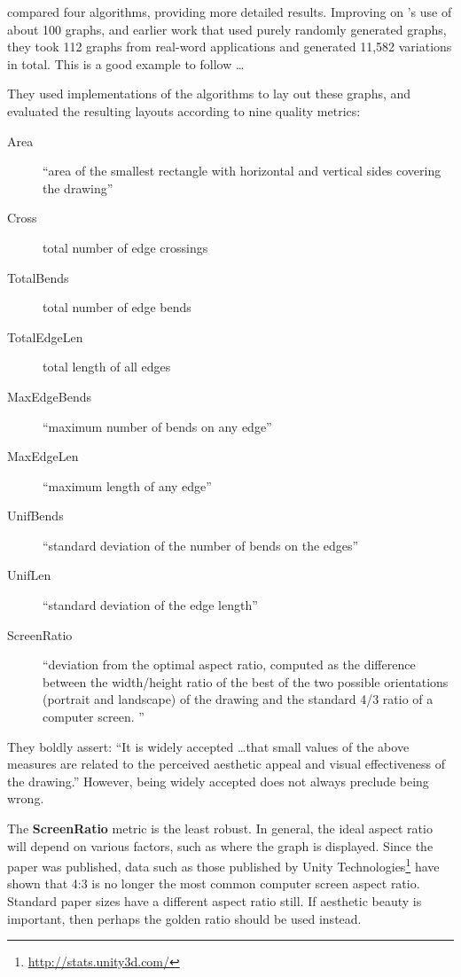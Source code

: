 \citet{DiBattista1997303} compared four algorithms, providing more detailed results.
Improving on \citeauthor{Himsolt95comparingand}'s use of about 100 graphs, and earlier work  that used purely randomly generated graphs, they took 112 graphs from real-word applications and generated 11,582 variations in total. This is a good example to follow \ldots

They used implementations of the algorithms to lay out these graphs, and evaluated the resulting layouts according to nine quality metrics:

\begin{description}
    \item[Area]
``area of the smallest rectangle with horizontal and vertical sides covering the drawing''
    \item[Cross]
total number of edge crossings
    \item[TotalBends]
total number of edge bends
    \item[TotalEdgeLen]
total length of all edges
    \item[MaxEdgeBends]
``maximum number of bends on any edge''
    \item[MaxEdgeLen]
``maximum length of any edge''
    \item[UnifBends]
``standard deviation of the number of bends on the edges''
    \item[UnifLen]
``standard deviation of the edge length''
    \item[ScreenRatio]
``deviation from the optimal aspect ratio, computed as the difference between the width/height ratio of the best of the two possible orientations (portrait and landscape) of the drawing and the standard 4/3 ratio of a computer screen. ''
\end{description}

They boldly assert: ``It is widely accepted \ldots that small values of the above measures are related to the perceived aesthetic appeal and visual effectiveness of the drawing.''
However, being widely accepted does not always preclude being wrong.

The \textbf{ScreenRatio} metric is the least robust.
In general, the ideal aspect ratio will depend on various factors, such as where the graph is displayed.
Since the paper was published, data such as those published by Unity Technologies\footnote{\url{http://stats.unity3d.com/}} have shown that 4:3 is no longer the most common computer screen aspect ratio.
Standard paper sizes have a different aspect ratio still.
If aesthetic beauty is important, then perhaps the golden ratio  should be used instead.

